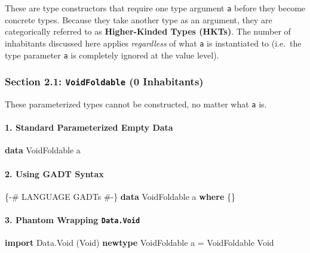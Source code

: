 \documentclass[
]{article}
\newenvironment{Shaded}{}{}
\newcommand{\DataTypeTok}[1]{\textcolor[rgb]{0.56,0.13,0.00}{#1}}
\newcommand{\KeywordTok}[1]{\textcolor[rgb]{0.00,0.44,0.13}{\textbf{#1}}}
\newcommand{\NormalTok}[1]{#1}
\newcommand{\OtherTok}[1]{\textcolor[rgb]{0.00,0.44,0.13}{#1}}
\begin{document}
These are type constructors that require one type argument \texttt{a}
before they become concrete types. Because they take another type as an
argument, they are categorically referred to as \textbf{Higher-Kinded
Types (HKTs)}. The number of inhabitants discussed here applies
\emph{regardless} of what \texttt{a} is instantiated to (i.e.~the type
parameter \texttt{a} is completely ignored at the value level).

\subsubsection{\texorpdfstring{Section 2.1: \texttt{VoidFoldable} (0
Inhabitants)}{Section 2.1: VoidFoldable (0 Inhabitants)}}\label{section-2.1-voidfoldable-0-inhabitants}

These parameterized types cannot be constructed, no matter what
\texttt{a} is.

\paragraph{1. Standard Parameterized Empty
Data}\label{standard-parameterized-empty-data}

\begin{Shaded}
\begin{Highlighting}[]
\KeywordTok{data} \DataTypeTok{VoidFoldable}\NormalTok{ a}
\end{Highlighting}
\end{Shaded}

\paragraph{2. Using GADT Syntax}\label{using-gadt-syntax}

\begin{Shaded}
\begin{Highlighting}[]
\OtherTok{\{{-}\# LANGUAGE GADTs \#{-}\}}
\KeywordTok{data} \DataTypeTok{VoidFoldable}\NormalTok{ a }\KeywordTok{where}\NormalTok{ \{\}}
\end{Highlighting}
\end{Shaded}

\paragraph{\texorpdfstring{3. Phantom Wrapping
\texttt{Data.Void}}{3. Phantom Wrapping Data.Void}}\label{phantom-wrapping-data.void}

\begin{Shaded}
\begin{Highlighting}[]
\KeywordTok{import} \DataTypeTok{Data.Void}\NormalTok{ (}\DataTypeTok{Void}\NormalTok{)}
\KeywordTok{newtype} \DataTypeTok{VoidFoldable}\NormalTok{ a }\OtherTok{=} \DataTypeTok{VoidFoldable} \DataTypeTok{Void}
\end{Highlighting}
\end{Shaded}
\end{document}
